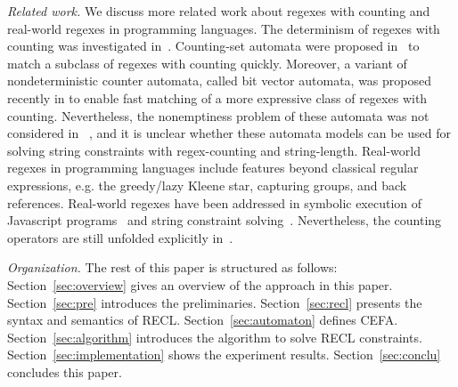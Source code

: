 \medskip
\noindent
\emph{Related work.} 
We discuss more related work about regexes with counting and real-world regexes in programming languages.  
The determinism of regexes with counting was investigated in~\cite{GGM12,CL15}. Counting-set automata were proposed in~\cite{redos_lenka,HS+23} to match a subclass of regexes with counting quickly. Moreover, a variant of nondeterministic counter automata, called bit vector automata, was proposed recently in \cite{GKM23} to enable fast matching of a more expressive class of regexes with counting.   Nevertheless, the nonemptiness problem of these automata was not considered in ~\cite{redos_lenka,HS+23,GKM23}, and it is unclear whether these automata models can be used for solving string constraints with regex-counting and string-length.
Real-world regexes in programming languages include features beyond classical regular expressions, e.g. the greedy/lazy Kleene star, capturing groups, and back references. Real-world regexes have been addressed in symbolic execution of Javascript programs~\cite{LMK19} and string constraint solving~\cite{CF+22}. Nevertheless, the counting operators are still unfolded explicitly in~\cite{CF+22}.  


\smallskip
\noindent
\emph{Organization.} 
The rest of this paper is structured as follows: Section~\ref{sec:overview} gives an overview of the approach in this paper. Section~\ref{sec:pre} introduces the preliminaries. 
Section~\ref{sec:recl} presents the syntax and semantics of RECL. 
Section~\ref{sec:automaton} defines CEFA. Section~\ref{sec:algorithm} introduces the algorithm to solve RECL constraints. Section~\ref{sec:implementation} shows the experiment results. Section~\ref{sec:conclu} concludes this paper.


